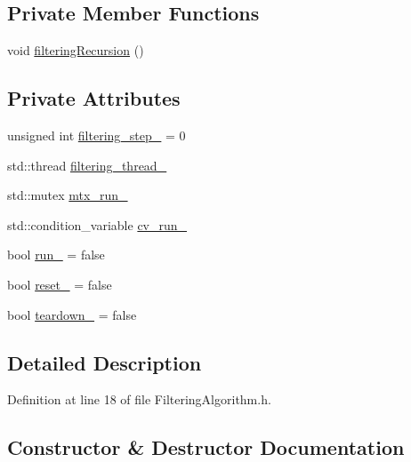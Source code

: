 \subsection*{Private Member Functions}
\begin{DoxyCompactItemize}
\item 
void \mbox{\hyperlink{classbfl_1_1FilteringAlgorithm_a139fe290f73939e72c88cb43c8ef7544}{filtering\+Recursion}} ()
\end{DoxyCompactItemize}
\subsection*{Private Attributes}
\begin{DoxyCompactItemize}
\item 
unsigned int \mbox{\hyperlink{classbfl_1_1FilteringAlgorithm_a1d08a5db263e415138d88c9a01535767}{filtering\+\_\+step\+\_\+}} = 0
\item 
std\+::thread \mbox{\hyperlink{classbfl_1_1FilteringAlgorithm_a2fa16711fd751628977afbbf9f7e9d6d}{filtering\+\_\+thread\+\_\+}}
\item 
std\+::mutex \mbox{\hyperlink{classbfl_1_1FilteringAlgorithm_a8983a40e915d3dbbc306d8f281ac449b}{mtx\+\_\+run\+\_\+}}
\item 
std\+::condition\+\_\+variable \mbox{\hyperlink{classbfl_1_1FilteringAlgorithm_ae92a6d82ce18c35516f42a7109c931af}{cv\+\_\+run\+\_\+}}
\item 
bool \mbox{\hyperlink{classbfl_1_1FilteringAlgorithm_a826eea2b551a2c2beab38394ed4c57c9}{run\+\_\+}} = false
\item 
bool \mbox{\hyperlink{classbfl_1_1FilteringAlgorithm_a4edf8ab29c4a1f8148ea276561299acb}{reset\+\_\+}} = false
\item 
bool \mbox{\hyperlink{classbfl_1_1FilteringAlgorithm_a3bc20cde7fc24767328f8a1ebd3e8cc8}{teardown\+\_\+}} = false
\end{DoxyCompactItemize}


\subsection{Detailed Description}


Definition at line 18 of file Filtering\+Algorithm.\+h.



\subsection{Constructor \& Destructor Documentation}
\mbox{\label{classbfl_1_1FilteringAlgorithm_ab286cc00b054717679fb13a3b709b1c4}} 
